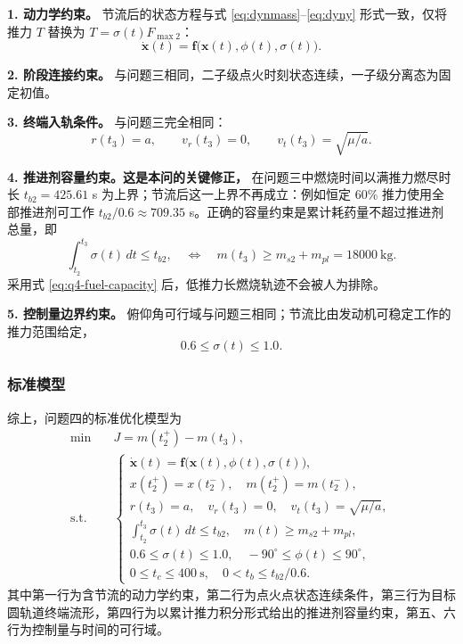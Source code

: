 \documentclass[withoutpreface,bwprint]{cumcmthesis}
\begin{document}
\textbf{1. 动力学约束。} 节流后的状态方程与式 \eqref{eq:dynmass}--\eqref{eq:dyny} 形式一致，仅将推力 $T$ 替换为 $T=\sigma(t)F_{\max2}$：
\begin{equation}
\dot{\bm x}(t)=\bm f\big(\bm x(t),\phi(t),\sigma(t)\big).
\label{eq:q4-dyn}
\end{equation}

\textbf{2. 阶段连接约束。} 与问题三相同，二子级点火时刻状态连续，一子级分离态为固定初值。

\textbf{3. 终端入轨条件。} 与问题三完全相同：
\begin{equation}
r(t_3)=a,\qquad v_r(t_3)=0,\qquad v_t(t_3)=\sqrt{\mu/a}.
\label{eq:q4-terminal}
\end{equation}

\textbf{4. 推进剂容量约束。这是本问的关键修正，} 在问题三中燃烧时间以满推力燃尽时长 $t_{b2}=425.61$ s 为上界；节流后这一上界不再成立：例如恒定 60\% 推力使用全部推进剂可工作 $t_{b2}/0.6\approx709.35$ s。正确的容量约束是累计耗药量不超过推进剂总量，即
\begin{equation}
\int_{t_2}^{t_3}\sigma(t)\,dt\le t_{b2},
\quad\Longleftrightarrow\quad
m(t_3)\ge m_{s2}+m_{pl}=18000\ \mathrm{kg}.
\label{eq:q4-fuel-capacity}
\end{equation}
采用式 \eqref{eq:q4-fuel-capacity} 后，低推力长燃烧轨迹不会被人为排除。

\textbf{5. 控制量边界约束。} 俯仰角可行域与问题三相同；节流比由发动机可稳定工作的推力范围给定，
\begin{equation}
0.6\le\sigma(t)\le1.0.
\label{eq:q4-sigma-bound}
\end{equation}

\subsubsection{标准模型}
综上，问题四的标准优化模型为
\begin{equation}
\begin{aligned}
\min\quad &J=m(t_2^+)-m(t_3),\\
\text{s.t.}\quad &\begin{cases}
\dot{\bm x}(t)=\bm f\big(\bm x(t),\phi(t),\sigma(t)\big), \\
x(t_2^+)=x(t_2^-),\quad m(t_2^+)=m(t_2^-),\\
r(t_3)=a,\quad v_r(t_3)=0,\quad v_t(t_3)=\sqrt{\mu/a},\\
\displaystyle\int_{t_2}^{t_3}\sigma(t)\,dt\le t_{b2},\quad m(t)\ge m_{s2}+m_{pl},\\
0.6\le\sigma(t)\le1.0,\quad -90^\circ\le\phi(t)\le90^\circ,\\
0\le t_c\le400\ \mathrm{s},\quad 0<t_b\le t_{b2}/0.6.
\end{cases}
\end{aligned}
\label{eq:ocpq4}
\end{equation}
其中第一行为含节流的动力学约束，第二行为点火点状态连续条件，第三行为目标圆轨道终端流形，第四行为以累计推力积分形式给出的推进剂容量约束，第五、六行为控制量与时间的可行域。
\end{document}
